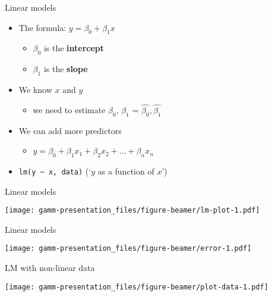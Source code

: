 \documentclass[ignorenonframetext,]{beamer}
\providecommand{\tightlist}{%
  \setlength{\itemsep}{0pt}\setlength{\parskip}{0pt}}
\begin{document}
\begin{frame}[fragile]{Linear models}
\protect\hypertarget{linear-models-6}{}

\begin{itemize}
\tightlist
\item
  The formula: \(y = \beta_0 + \beta_1x\)

  \begin{itemize}
  \tightlist
  \item
    \(\beta_0\) is the \textbf{intercept}
  \item
    \(\beta_1\) is the \textbf{slope}
  \end{itemize}
\item
  We know \(x\) and \(y\)

  \begin{itemize}
  \tightlist
  \item
    we need to estimate \(\beta_0\), \(\beta_1\) =
    \(\hat{\beta_0}, \hat{\beta_1}\)
  \end{itemize}
\item
  We can add more predictors

  \begin{itemize}
  \tightlist
  \item
    \(y = \beta_0 + \beta_1x_1 + \beta_2x_2 + ... + \beta_nx_n\)
  \end{itemize}
\item
  \texttt{lm(y\ \textasciitilde{}\ x,\ data)} (`\(y\) as a function of
  \(x\)')
\end{itemize}

\end{frame}

\begin{frame}{Linear models}
\protect\hypertarget{linear-models-7}{}

\texttt{[image: gamm-presentation\_files/figure-beamer/lm-plot-1.pdf]}

\end{frame}

\begin{frame}{Linear models}
\protect\hypertarget{linear-models-8}{}

\texttt{[image: gamm-presentation\_files/figure-beamer/error-1.pdf]}

\end{frame}

\begin{frame}{LM with non-linear data}
\protect\hypertarget{lm-with-non-linear-data}{}

\texttt{[image: gamm-presentation\_files/figure-beamer/plot-data-1.pdf]}

\end{frame}
\end{document}
